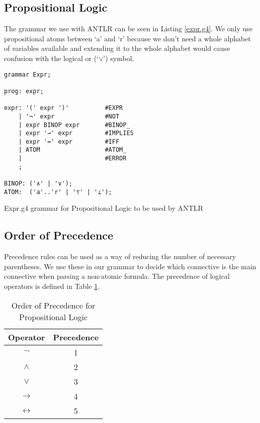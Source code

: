 \documentclass{report}
\begin{document}
\subsection{Propositional Logic}

The grammar we use with ANTLR can be seen in Listing \ref{expr.g4}. We only use propositional atoms between `a' and `r' because we don't need a whole alphabet of variables available and extending it to the whole alphabet would cause confusion with the logical or (`$\lor$') symbol. 

\begin{listing}[ht]
\begin{verbatim}
grammar Expr;	

prog: expr;

expr: '(' expr ')'          #EXPR
    | '¬' expr              #NOT
    | expr BINOP expr       #BINOP_
    | expr '→' expr         #IMPLIES
    | expr '↔' expr         #IFF
    | ATOM                  #ATOM_
    |                       #ERROR
    ;

BINOP: ('∧' | '∨');
ATOM:  ('a'..'r' | '⊤' | '⊥');

\end{verbatim}
\caption{Expr.g4 grammar for Propositional Logic to be used by ANTLR}
\label{expr.g4}
\end{listing}

\subsection{Order of Precedence}

Precedence rules can be used as a way of reducing the number of necessary parentheses. We use these in our grammar to decide which connective is the main connective when parsing a non-atomic formula. The precedence of logical operators is defined in Table \ref{orderofprecendence}.

\begin{table}[h]
\begin{center}
\begin{tabular}{|| c | c ||}
    \hline
    Operator & Precedence \\ \hline 
    $\lnot$  & 1 \\
    $\land$  & 2 \\
    $\lor$   & 3 \\
    $\to$    & 4 \\
    $\leftrightarrow$ & 5 \\ \hline
\end{tabular}
\caption{Order of Precedence for Propositional Logic}
\label{orderofprecendence}
\end{center}
\end{table}
\end{document}
